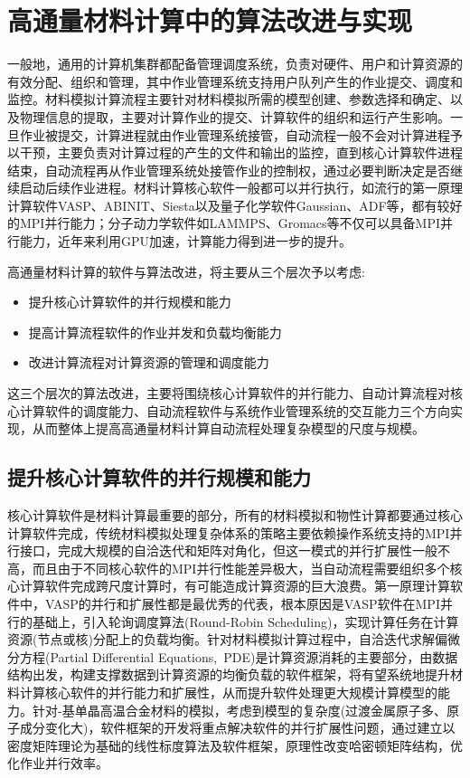 \section{高通量材料计算中的算法改进与实现}
一般地，通用的计算机集群都配备管理调度系统，负责对硬件、用户和计算资源的有效分配、组织和管理，其中作业管理系统支持用户队列产生的作业提交、调度和监控。材料模拟计算流程主要针对材料模拟所需的模型创建、参数选择和确定、以及物理信息的提取，主要对计算作业的提交、计算软件的组织和运行产生影响。一旦作业被提交，计算进程就由作业管理系统接管，自动流程一般不会对计算进程予以干预，主要负责对计算过程的产生的文件和输出的监控，直到核心计算软件进程结束，自动流程再从作业管理系统处接管作业的控制权，通过必要判断决定是否继续启动后续作业进程。材料计算核心软件一般都可以并行执行，如流行的第一原理计算软件\textrm{VASP}、\textrm{ABINIT}、\textrm{Siesta}以及量子化学软件\textrm{Gaussian}、\textrm{ADF}等，都有较好的\textrm{MPI}并行能力；分子动力学软件如\textrm{LAMMPS}、\textrm{Gromacs}等不仅可以具备\textrm{MPI}并行能力，近年来利用\textrm{GPU}加速，计算能力得到进一步的提升。

高通量材料计算的软件与算法改进，将主要从三个层次予以考虑:
\begin{itemize}
	\item 提升核心计算软件的并行规模和能力
	\item 提高计算流程软件的作业并发和负载均衡能力
	\item 改进计算流程对计算资源的管理和调度能力
\end{itemize}
这三个层次的算法改进，主要将围绕核心计算软件的并行能力、自动计算流程对核心计算软件的调度能力、自动流程软件与系统作业管理系统的交互能力三个方向实现，从而整体上提高高通量材料计算自动流程处理复杂模型的尺度与规模。

\subsection{提升核心计算软件的并行规模和能力}
核心计算软件是材料计算最重要的部分，所有的材料模拟和物性计算都要通过核心计算软件完成，传统材料模拟处理复杂体系的策略主要依赖操作系统支持的\textrm{MPI}并行接口，完成大规模的自洽迭代和矩阵对角化，但这一模式的并行扩展性一般不高，而且由于不同核心软件的\textrm{MPI}并行性能差异极大，当自动流程需要组织多个核心计算软件完成跨尺度计算时，有可能造成计算资源的巨大浪费。第一原理计算软件中，\textrm{VASP}的并行和扩展性都是最优秀的代表，根本原因是\textrm{VASP}软件在\textrm{MPI}并行的基础上，引入轮询调度算法\textrm{(Round-Robin Scheduling)}，实现计算任务在计算资源(节点或核)分配上的负载均衡。针对材料模拟计算过程中，自洽迭代求解偏微分方程\textrm{(Partial Differential Equations,~PDE)}是计算资源消耗的主要部分，由数据结构出发，构建支撑数据到计算资源的均衡负载的软件框架，将有望系统地提升材料计算核心软件的并行能力和扩展性，从而提升软件处理更大规模计算模型的能力。针对-基单晶高温合金材料的模拟，考虑到模型的复杂度(过渡金属原子多、原子成分变化大)，软件框架的开发将重点解决软件的并行扩展性问题，通过建立以密度矩阵理论为基础的线性标度算法及软件框架，原理性改变哈密顿矩阵结构，优化作业并行效率。

